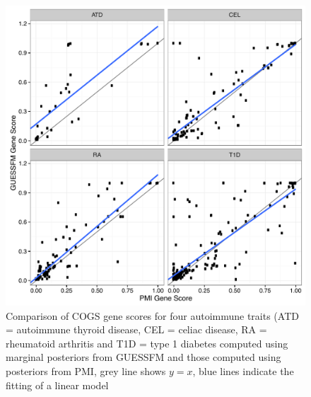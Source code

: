 \documentclass[a4paper,11pt]{report}
\begin{document}

\begin{figure}[h]
\includegraphics[width=\textwidth]{gfm_vs_pmi_gs.pdf}
\caption{Comparison of COGS gene scores for four autoimmune traits (ATD = autoimmune thyroid disease, CEL = celiac disease, RA = rheumatoid arthritis and T1D = type 1 diabetes computed using marginal posteriors from GUESSFM and those computed using posteriors from PMI, grey line shows $y=x$, blue lines indicate the fitting of a linear model}
\label{fig:gfm_vs_pmi_gs}
\end{figure}
\end{document}
